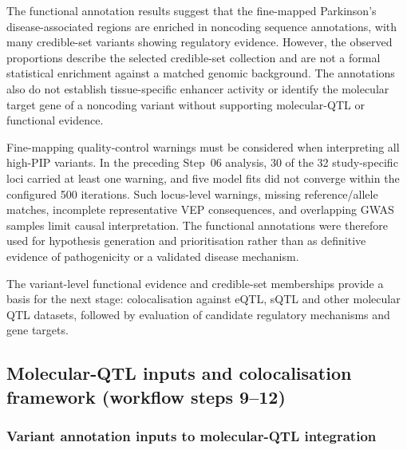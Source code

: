 \documentclass[11pt,a4paper]{article}
\begin{document}
The functional annotation results suggest that the
fine-mapped Parkinson's disease-associated regions
are enriched in noncoding sequence annotations,
with many credible-set variants showing regulatory
evidence. However, the observed proportions describe
the selected credible-set collection and are not a
formal statistical enrichment against a matched
genomic background. The annotations also do not
establish tissue-specific enhancer activity or
identify the molecular target gene of a noncoding
variant without supporting molecular-QTL or
functional evidence.

Fine-mapping quality-control warnings must be
considered when interpreting all high-PIP variants.
In the preceding Step~06 analysis, 30 of the 32
study-specific loci carried at least one warning,
and five model fits did not converge within the
configured 500 iterations. Such locus-level warnings,
missing reference/allele matches, incomplete
representative VEP consequences, and overlapping
GWAS samples limit causal interpretation. The
functional annotations were therefore used for
hypothesis generation and prioritisation rather than
as definitive evidence of pathogenicity or a
validated disease mechanism.

The variant-level functional evidence and credible-set
memberships provide a basis for the next stage:
colocalisation against eQTL, sQTL and other molecular
QTL datasets, followed by evaluation of candidate
regulatory mechanisms and gene targets.

%


\subsection{Molecular-QTL inputs and colocalisation framework (workflow steps 9--12)}
\label{sec:functional_annotation_coloc}

\subsubsection{Variant annotation inputs to molecular-QTL integration}
\label{subsec:functional_annotation}
\end{document}
